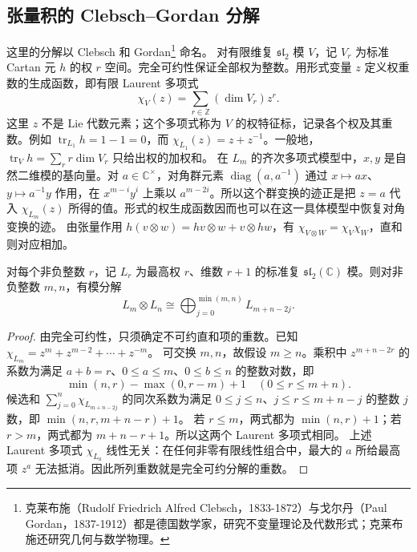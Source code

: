 \subsection{张量积的 Clebsch–Gordan 分解}
\label{b5:subsec:1403:03}

这里的分解以 Clebsch 和 Gordan\footnote{克莱布施（Rudolf Friedrich Alfred Clebsch，1833-1872）与戈尔丹（Paul Gordan，1837-1912）都是德国数学家，研究不变量理论及代数形式；克莱布施还研究几何与数学物理。} 命名。 对有限维复 \(\mathfrak{sl}_2\) 模 \(V\)，记 \(V_r\) 为标准 Cartan 元 \(h\) 的权 \(r\) 空间。完全可约性保证全部权为整数。用形式变量 \(z\) 定义权重数的生成函数，即有限 Laurent 多项式
\[
	\chi_V(z)=\sum_{r\in\mathbb Z}(\dim V_r)z^r.
\]
这里 \(z\) 不是 Lie 代数元素；这个多项式称为 \(V\) 的权特征标，记录各个权及其重数。例如 \(\operatorname{tr}_{L_1}h=1-1=0\)，而 \(\chi_{L_1}(z)=z+z^{-1}\)。一般地，\(\operatorname{tr}_Vh=\sum_r r\dim V_r\) 只给出权的加权和。
\ProseParagraphBreak
在 \(L_m\) 的齐次多项式模型中，\(x,y\) 是自然二维模的基向量。对 \(a\in\mathbb C^\times\)，对角群元素 \(\operatorname{diag}(a,a^{-1})\) 通过 \(x\mapsto ax\)、\(y\mapsto a^{-1}y\) 作用，在 \(x^{m-i}y^i\) 上乘以 \(a^{m-2i}\)。所以这个群变换的迹正是把 \(z=a\) 代入 \(\chi_{L_m}(z)\) 所得的值。形式的权生成函数因而也可以在这一具体模型中恢复对角变换的迹。
\ProseParagraphBreak
由张量作用 \(h(v\otimes w)=hv\otimes w+v\otimes hw\)，有 \(\chi_{V\otimes W}=\chi_V\chi_W\)，直和则对应相加。
\begin{theorem}\label{b5:thm:sl2-clebsch-gordan}
	对每个非负整数 \(r\)，记 \(L_r\) 为最高权 \(r\)、维数 \(r+1\) 的标准复 \(\mathfrak{sl}_2(\mathbb C)\) 模。则对非负整数 \(m,n\)，有模分解
	\[
		L_m\otimes L_n\cong \bigoplus_{j=0}^{\min(m,n)}L_{m+n-2j}.
	\]
\end{theorem}
\begin{proof}
	由完全可约性，只须确定不可约直和项的重数。已知 \(\chi_{L_m}=z^m+z^{m-2}+\cdots+z^{-m}\)。 可交换 \(m,n\)，故假设 \(m\ge n\)。乘积中 \(z^{m+n-2r}\) 的系数为满足 \(a+b=r\)、\(0\le a\le m\)、\(0\le b\le n\) 的整数对数，即
	\[
		\min(n,r)-\max(0,r-m)+1 \quad(0\le r\le m+n).
	\]
	候选和 \(\sum_{j=0}^{n}\chi_{L_{m+n-2j}}\) 的同次系数为满足 \(0\le j\le n\)、\(j\le r\le m+n-j\) 的整数 \(j\) 数，即 \(\min(n,r,m+n-r)+1\)。 若 \(r\le m\)，两式都为 \(\min(n,r)+1\)；若 \(r>m\)，两式都为 \(m+n-r+1\)。所以这两个 Laurent 多项式相同。 上述 Laurent 多项式 \(\chi_{L_a}\) 线性无关：在任何非零有限线性组合中，最大的 \(a\) 所给最高项 \(z^a\) 无法抵消。因此所列重数就是完全可约分解的重数。
\end{proof}
